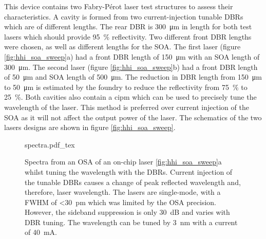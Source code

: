 This device contains two Fabry-P\'{e}rot laser test structures to assess their characteristics. A cavity is formed from two current-injection tunable \acp{DBR} which are of different lengths. The rear \ac{DBR} is \SI{300}{\um} in length for both test lasers which should provide \SI{95}{\percent} reflectivity. Two different front \ac{DBR} lengths were chosen, as well as different lengths for the \ac{SOA}. The first laser (figure \ref{fig:hhi_soa_sweep}a) had a front \ac{DBR} length of \SI{150}{\um} with an \ac{SOA} length of \SI{300}{\um}. The second laser (figure \ref{fig:hhi_soa_sweep}b) had a front \ac{DBR} length of \SI{50}{\um} and \ac{SOA} length of \SI{500}{\um}. The reduction in \ac{DBR} length from \SI{150}{\um} to \SI{50}{\um} is estimated by the foundry to reduce the reflectivity from \SI{75}{\percent} to \SI{25}{\percent}. Both cavities also contain a \ac{cipm} which can be used to precisely tune the wavelength of the laser. This method is preferred over current injection of the \ac{SOA} as it will not affect the output power of the laser. The schematics of the two lasers designs are shown in figure \ref{fig:hhi_soa_sweep}.

\begin{figure}[t]
	\centering
	\small	
	\def\svgwidth{0.9\textwidth} 
	{spectra.pdf_tex}
	\caption[Spectra of the HHI laser whilst injecting current to the of DBRs]{Spectra from an \acs{OSA} of an on-chip laser \ref{fig:hhi_soa_sweep}a whilst tuning the wavelength with the \acsp{DBR}. Current injection of the tunable \acsp{DBR} causes a change of peak reflected wavelength and, therefore, laser wavelength. The lasers are single-mode, with a \acs{FWHM} of \SI{<30}{pm} which was limited by the \ac{OSA} precision. However, the sideband suppression is only \SI{30}{dB} and varies with \acs{DBR} tuning. The wavelength can be tuned by \SI{3}{nm} with a current of \SI{40}{\mA}.}
	\label{fig:hhi_dbr_sweep}
\end{figure}


